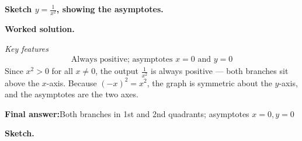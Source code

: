 \documentclass[11pt]{article}
\newcommand{\question}[1]{\par\medskip\noindent\textbf{#1}\par}
\begin{document}
\question{Sketch \( y = \frac{1}{x^2} \), showing the asymptotes.}

\textbf{Worked solution.}

\textit{Key features}
\[\begin{gathered}
\text{Always positive; asymptotes } x = 0 \text{ and } y = 0
\end{gathered}\]
Since \( x^2 > 0 \) for all \( x \neq 0 \), the output \( \tfrac{1}{x^2} \) is always positive --- both branches sit above the \( x \)-axis. Because \( (-x)^2 = x^2 \), the graph is symmetric about the \( y \)-axis, and the asymptotes are the two axes.

\begin{answerbox}
\textbf{Final answer:}\quad Both branches in 1st and 2nd quadrants; asymptotes \(\displaystyle x = 0, y = 0\)
\end{answerbox}
\textbf{Sketch.}
\end{document}
